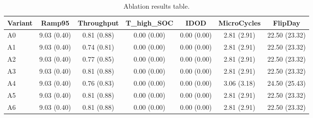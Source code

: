 \begin{table}[t]
\centering
\caption{Ablation results table.}
\label{tab:ablation_auto}
\begin{tabular}{lcccccc}
\toprule
Variant & Ramp95 & Throughput & T\_high\_SOC & IDOD & MicroCycles & FlipDay \\
\midrule
A0 & 9.03 (0.40) & 0.81 (0.88) & 0.00 (0.00) & 0.00 (0.00) & 2.81 (2.91) & 22.50 (23.32) \\
A1 & 9.03 (0.40) & 0.74 (0.81) & 0.00 (0.00) & 0.00 (0.00) & 2.81 (2.91) & 22.50 (23.32) \\
A2 & 9.03 (0.40) & 0.77 (0.85) & 0.00 (0.00) & 0.00 (0.00) & 2.81 (2.91) & 22.50 (23.32) \\
A3 & 9.03 (0.40) & 0.81 (0.88) & 0.00 (0.00) & 0.00 (0.00) & 2.81 (2.91) & 22.50 (23.32) \\
A4 & 9.03 (0.40) & 0.76 (0.83) & 0.00 (0.00) & 0.00 (0.00) & 3.06 (3.18) & 24.50 (25.43) \\
A5 & 9.03 (0.40) & 0.81 (0.88) & 0.00 (0.00) & 0.00 (0.00) & 2.81 (2.91) & 22.50 (23.32) \\
A6 & 9.03 (0.40) & 0.81 (0.88) & 0.00 (0.00) & 0.00 (0.00) & 2.81 (2.91) & 22.50 (23.32) \\
\bottomrule
\end{tabular}
\end{table}
